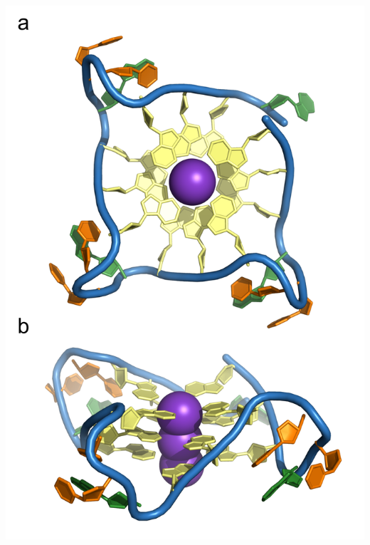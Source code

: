 \documentclass[12pt,a4paper,]{report}
\let\origfigure=\figure
\let\endorigfigure=\endfigure
\renewenvironment{figure}[1][2] {
    \expandafter\origfigure\expandafter[H]
} {
    \endorigfigure
}
\begin{document}
\begin{figure}[htbp]
\end{figure}

\newpage

\begin{figure}[htbp]
\centering
\includegraphics[width=\textwidth,height=562pt,keepaspectratio]{introduction/figures/xray_structure.png}
\caption[The Human Telomeric Sequence forms a G-Quadruplex]{\textbf{The   Human   Telomeric   Sequence   forms   a   G-Quadruplex}   \textbf{a)}   top   and   \textbf{b)}   side   view   of   a   parallel   G4   structure   solved   by   X-ray   crystallography   (PDB:   1KF1,   Parkinson   et   al. 2002).   The   sequence   used   is   (TTAGGG)4,   corresponding   to   four   of   the   human   telomeric   repeat.   Gs   are   coloured   in   yellow,   As   in   green   and   Ts   in   orange.   Potassium   cations   are   coloured   in   purple.}
\end{figure}
\end{document}
